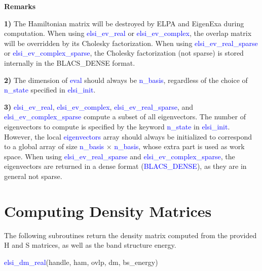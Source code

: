 \documentclass{report}
\begin{document}
\textbf{Remarks}

\textbf{1)} The Hamiltonian matrix will be destroyed by ELPA and EigenExa during computation. When using \textcolor{blue}{elsi\_ev\_real} or \textcolor{blue}{elsi\_ev\_complex}, the overlap matrix will be overridden by its Cholesky factorization. When using \textcolor{blue}{elsi\_ev\_real\_sparse} or \textcolor{blue}{elsi\_ev\_complex\_sparse}, the Cholesky factorization (not sparse) is stored internally in the BLACS\_DENSE format.

\textbf{2)} The dimension of \textcolor{blue}{eval} should always be \textcolor{blue}{n\_basis}, regardless of the choice of \textcolor{blue}{n\_state} specified in \textcolor{blue}{elsi\_init}.

\textbf{3)} \textcolor{blue}{elsi\_ev\_real}, \textcolor{blue}{elsi\_ev\_complex}, \textcolor{blue}{elsi\_ev\_real\_sparse}, and \textcolor{blue}{elsi\_ev\_complex\_sparse} compute a subset of all eigenvectors. The number of eigenvectors to compute is specified by the keyword \textcolor{blue}{n\_state} in \textcolor{blue}{elsi\_init}. However, the local \textcolor{blue}{eigenvectors} array should always be initialized to correspond to a global array of size \textcolor{blue}{n\_basis} $\times$ \textcolor{blue}{n\_basis}, whose extra part is used as work space. When using \textcolor{blue}{elsi\_ev\_real\_sparse} and \textcolor{blue}{elsi\_ev\_complex\_sparse}, the eigenvectors are returned in a dense format (\textcolor{blue}{BLACS\_DENSE}), as they are in general not sparse.

\section{Computing Density Matrices}
\label{sec:dm}
The following subroutines return the density matrix computed from the provided H and S matrices, as well as the band structure energy.
\begin{labeling}{\hspace{6cm}}
\item [\hspace{0.3cm} \textcolor{blue}{elsi\_dm\_real}(handle, ham, ovlp, dm, bs\_energy)]
\end{labeling}
\end{document}
